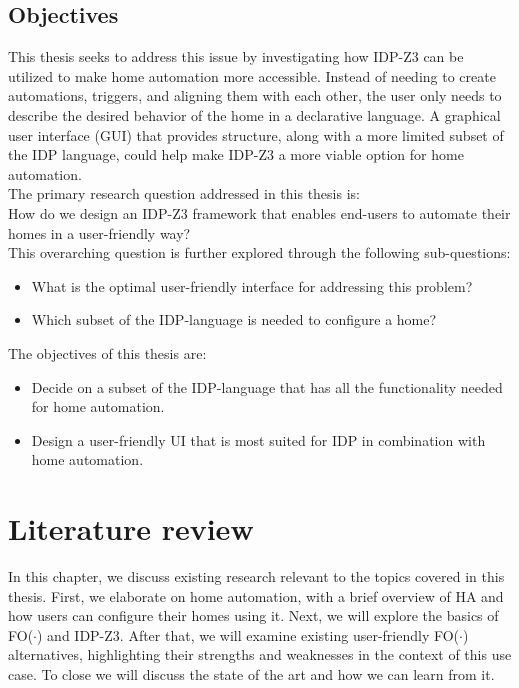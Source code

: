 \documentclass[11pt,a4paper]{report}
\newcommand{\fodot}{FO($\cdot$)\xspace}
\begin{document}
\section{Objectives}
This thesis seeks to address this issue by investigating how IDP-Z3 can be utilized to make home automation more accessible. Instead of needing to create automations, triggers, and aligning them with each other, the user only needs to describe the desired behavior of the home in a declarative language. A graphical user interface (GUI) that provides structure, along with a more limited subset of the IDP language, could help make IDP-Z3 a more viable option for home automation.\\
The primary research question addressed in this thesis is:\\
How do we design an IDP-Z3 framework that enables end-users to automate their homes in a user-friendly way?\\
This overarching question is further explored through the following sub-questions:
\begin{itemize}
    \item What is the optimal user-friendly interface for addressing this problem?
    \item Which subset of the IDP-language is needed to configure a home?
\end{itemize}
The objectives of this thesis are:
\begin{itemize}
    \item Decide on a subset of the IDP-language that has all the functionality needed for home automation.
    \item Design a user-friendly UI that is most suited for IDP in combination with home automation.
\end{itemize}





\chapter{Literature review}
In this chapter, we discuss existing research relevant to the topics covered in this thesis. First, we elaborate on home automation, with a brief overview of HA and how users can configure their homes using it. Next, we will explore the basics of \fodot and IDP-Z3. After that, we will examine existing user-friendly \fodot alternatives, highlighting their strengths and weaknesses in the context of this use case. To close we will discuss the state of the art and how we can learn from it.
\end{document}
